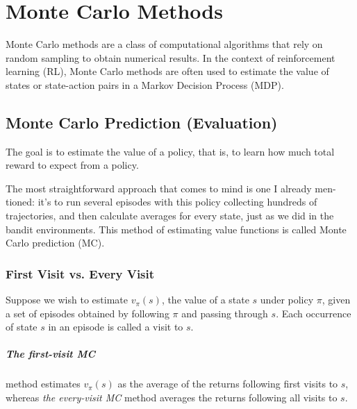 \chapter{Monte Carlo Methods}
Monte Carlo methods are a class of computational algorithms that rely on random sampling to obtain numerical results. In the context of reinforcement learning (RL), Monte Carlo methods are often used to estimate the value of states or state-action pairs in a Markov Decision Process (MDP).


\section{Monte Carlo Prediction (Evaluation)}
The goal is to estimate the value of a policy, that is, to learn how much total reward to expect from a policy. 

The most straightforward approach that comes to mind is one I already men- tioned: it’s to run several episodes with this policy collecting hundreds of trajectories, and then calculate averages for every state, just as we did in the bandit environments. This method of estimating value functions is called Monte Carlo prediction (MC).


\subsection{First Visit vs. Every Visit}
Suppose we wish to estimate $v_\pi(s)$, the value of a state $s$ under policy $\pi$, given a set of episodes obtained by following $\pi$ and passing through $s$. Each occurrence of state $s$ in an episode is called a visit to $s$. 

\paragraph{The first-visit MC} method estimates $v_\pi(s)$ as the average of the returns following first visits to $s$, whereas \textit{the every-visit MC} method averages the returns following all visits to $s$.


